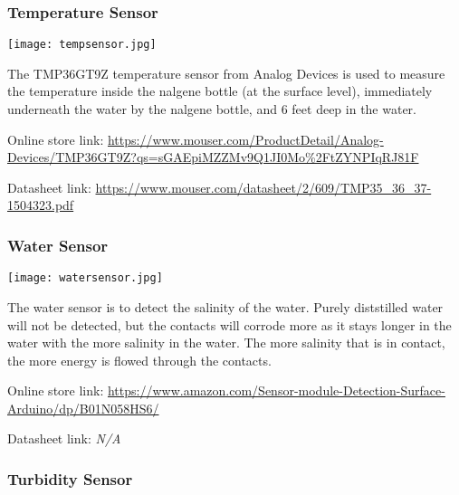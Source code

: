 \hypertarget{temp}{}
\subsubsection{Temperature Sensor}

\hspace{2em}
\texttt{[image: tempsensor.jpg]}

\begin{flushleft}
    The TMP36GT9Z temperature sensor from Analog Devices is used to measure 
    the temperature inside the nalgene bottle (at the surface level), 
    immediately underneath the water by the nalgene bottle, and 6 feet deep in 
    the water.
    \newline

    Online store link: \newline
    \footnotesize\url{https://www.mouser.com/ProductDetail/Analog-Devices/TMP36GT9Z?qs=sGAEpiMZZMv9Q1JI0Mo%2FtZYNPIqRJ81F}

    \normalsize Datasheet link: \newline
    \footnotesize\url{https://www.mouser.com/datasheet/2/609/TMP35_36_37-1504323.pdf}
\end{flushleft}

\hypertarget{salinity}{}
\subsubsection{Water Sensor}

\hspace{2em}
\texttt{[image: watersensor.jpg]}

\begin{flushleft}
    The water sensor is to detect the salinity of the water. Purely diststilled
     water will not be detected, but the contacts will corrode more as it stays
     longer in the water with the more salinity in the water. The more salinity
     that is in contact, the more energy is flowed through the contacts.
    \newline

    Online store link: \newline
    \footnotesize\url{https://www.amazon.com/Sensor-module-Detection-Surface-Arduino/dp/B01N058HS6/}

    \normalsize Datasheet link: \newline
    \footnotesize \emph{N/A}
\end{flushleft}

\hypertarget{turbidity}{}
\subsubsection{Turbidity Sensor}

